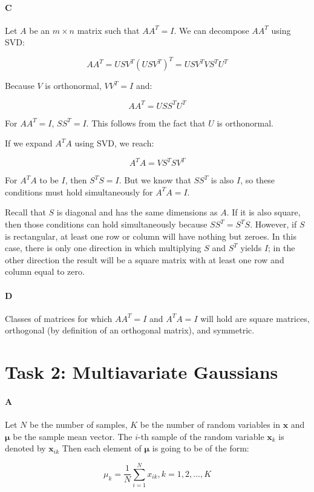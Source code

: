 \documentclass[12pt]{article}
\begin{document}
\paragraph{C}
Let $A$ be an $m \times n$ matrix such that $AA^T=I$. We can decompose $AA^T$ using SVD:

\[
AA^T = USV^T\left(USV^T\right)^T = USV^TVS^TU^T\]

Because $V$ is orthonormal, $VV^T=I$ and:

\[
AA^T = USS^TU^T
\]

For $AA^T=I$, $SS^T=I$. This follows from the fact that $U$ is orthonormal.

If we expand $A^TA$ using SVD, we reach:

\[
A^TA = VS^TSV^T
\]

For $A^TA$ to be $I$, then $S^TS=I$. But we know that $SS^T$ is also $I$, so these conditions must hold simultaneously for $A^TA=I$.

Recall that $S$ is diagonal and has the same dimensions as $A$. If it is also square, then those conditions can hold simultaneously because $SS^T=S^TS$. However, if $S$ is rectangular, at least one row or column will have nothing but zeroes. In this case, there is only one direction in which multiplying $S$ and $S^T$ yields $I$; in the other direction the result will be a square matrix with at least one row and column equal to zero.

\paragraph{D}
Classes of matrices for which $AA^T = I$ and $A^TA=I$ will hold are square matrices, orthogonal (by definition of an orthogonal matrix), and symmetric.

\section{Task 2: Multiavariate Gaussians}

\paragraph{A}
Let $N$ be the number of samples, $K$ be the number of random variables in $\mathbf{x}$ and $\mathbf{\mu}$ be the sample mean vector. The $i$-th sample of the random variable $\mathbf{x}_k$ is denoted by $\mathbf{x}_{ik}$ Then each element of $\mathbf{\mu}$ is going to be of the form:

\begin{equation}
\mu_k = \frac{1}{N}\displaystyle\sum_{i=1}^{N}{x_{ik}}, k=1,2,...,K
\end{equation}
\end{document}
